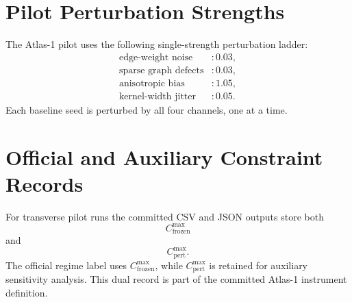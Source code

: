 \documentclass[11pt]{article}
\begin{document}
\section{Pilot Perturbation Strengths}
The Atlas-1 pilot uses the following single-strength perturbation ladder:
\begin{align}
\text{edge-weight noise} &: 0.03, \\
\text{sparse graph defects} &: 0.03, \\
\text{anisotropic bias} &: 1.05, \\
\text{kernel-width jitter} &: 0.05.
\end{align}
Each baseline seed is perturbed by all four channels, one at a time.

\section{Official and Auxiliary Constraint Records}
For transverse pilot runs the committed CSV and JSON outputs store both
\begin{equation}
C_{\mathrm{frozen}}^{\max}
\end{equation}
and
\begin{equation}
C_{\mathrm{pert}}^{\max}.
\end{equation}
The official regime label uses $C_{\mathrm{frozen}}^{\max}$, while $C_{\mathrm{pert}}^{\max}$ is retained for auxiliary sensitivity analysis. This dual record is part of the committed Atlas-1 instrument definition.
\end{document}
